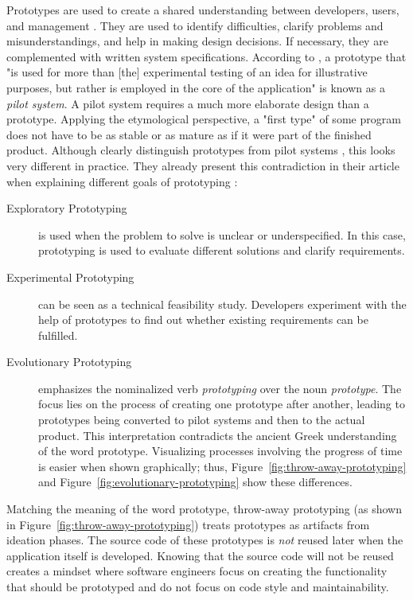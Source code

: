 Prototypes are used to create a shared understanding between developers, users, and management \cite{budde_what_1992}.
They are used to identify difficulties, clarify problems and misunderstandings, and help in making design decisions.
If necessary, they are complemented with written system specifications.
According to \cite{budde_what_1992}, a prototype that "is used for more than [the] experimental testing of an idea for illustrative purposes, but rather is employed in the core of the application" is known as a \emph{pilot system}.
A pilot system requires a much more elaborate design than a prototype.
Applying the etymological perspective, a "first type" of some program does not have to be as stable or as mature as if it were part of the finished product.
Although \citeauthor{budde_what_1992} clearly distinguish prototypes from pilot systems \cite{budde_what_1992}, this looks very different in practice.
They already present this contradiction in their article when explaining different goals of prototyping \cite{budde_what_1992}:
%
\begin{description}
   \item[Exploratory Prototyping] is used when the problem to solve is unclear or underspecified. In this case, prototyping is used to evaluate different solutions and clarify requirements.
   \item[Experimental Prototyping] can be seen as a technical feasibility study. Developers experiment with the help of prototypes to find out whether existing requirements can be fulfilled.
   \item[Evolutionary Prototyping] emphasizes the nominalized verb \emph{prototyping} over the noun \emph{prototype}. The focus lies on the process of creating one prototype after another, leading to prototypes being converted to pilot systems and then to the actual product. This interpretation contradicts the ancient Greek understanding of the word prototype. Visualizing processes involving the progress of time is easier when shown graphically; thus, Figure~\ref{fig:throw-away-prototyping} and Figure~\ref{fig:evolutionary-prototyping} show these differences.
\end{description}
%
Matching the meaning of the word prototype, throw-away prototyping (as shown in Figure~\ref{fig:throw-away-prototyping}) treats prototypes as artifacts from ideation phases.
The source code of these prototypes is \emph{not} reused later when the application itself is developed.
Knowing that the source code will not be reused creates a mindset where software engineers focus on creating the functionality that should be prototyped and do not focus on code style and maintainability.

